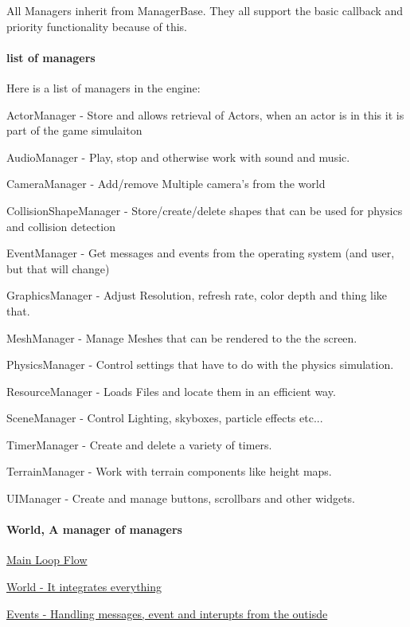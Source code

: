 All Managers inherit from ManagerBase. They all support the basic callback and priority functionality because of this.\hypertarget{index_A}{}\paragraph{list of managers}\label{index_A}
Here is a list of managers in the engine:
\begin{DoxyItemize}
\item ActorManager -\/ Store and allows retrieval of Actors, when an actor is in this it is part of the game simulaiton
\item AudioManager -\/ Play, stop and otherwise work with sound and music.
\item CameraManager -\/ Add/remove Multiple camera's from the world
\item CollisionShapeManager -\/ Store/create/delete shapes that can be used for physics and collision detection
\item EventManager -\/ Get messages and events from the operating system (and user, but that will change)
\item GraphicsManager -\/ Adjust Resolution, refresh rate, color depth and thing like that.
\item MeshManager -\/ Manage Meshes that can be rendered to the the screen.
\item PhysicsManager -\/ Control settings that have to do with the physics simulation.
\item ResourceManager -\/ Loads Files and locate them in an efficient way.
\item SceneManager -\/ Control Lighting, skyboxes, particle effects etc...
\item TimerManager -\/ Create and delete a variety of timers.
\item TerrainManager -\/ Work with terrain components like height maps.
\item UIManager -\/ Create and manage buttons, scrollbars and other widgets.
\end{DoxyItemize}\hypertarget{index_The}{}\paragraph{World, A manager of managers}\label{index_The}
\hyperlink{mainloop1}{Main Loop Flow}

\hyperlink{classMezzanine_1_1World}{World -\/ It integrates everything}

\hyperlink{classMezzanine_1_1EventManager}{Events -\/ Handling messages, event and interupts from the outisde}

